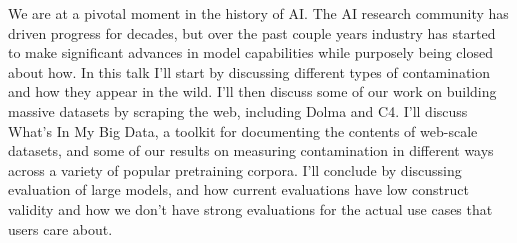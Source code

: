 We are at a pivotal moment in the history of AI. The AI research community has driven progress for decades, but over the past couple years industry has started to make significant advances in model capabilities while purposely being closed about how. In this talk I'll start by discussing different types of contamination and how they appear in the wild. I'll then discuss some of our work on building massive datasets by scraping the web, including Dolma and C4. I'll discuss What's In My Big Data, a toolkit for documenting the contents of web-scale datasets, and some of our results on measuring contamination in different ways across a variety of popular pretraining corpora. I'll conclude by discussing evaluation of large models, and how current evaluations have low construct validity and how we don't have strong evaluations for the actual use cases that users care about.